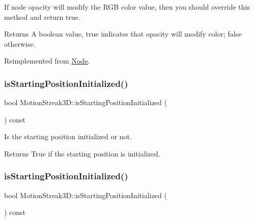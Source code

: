 If node opacity will modify the R\+GB color value, then you should override this method and return true. \begin{DoxyReturn}{Returns}
A boolean value, true indicates that opacity will modify color; false otherwise. 
\end{DoxyReturn}


Reimplemented from \hyperlink{classNode_ae6ce32d2088e2bb3426608334f1091c5}{Node}.

\mbox{\label{classMotionStreak3D_a886e755c13fabbeab8f326b512289ade}} 
\subsubsection{\texorpdfstring{is\+Starting\+Position\+Initialized()}{isStartingPositionInitialized()}\hspace{0.1cm}{\footnotesize\ttfamily [1/2]}}
{\footnotesize\ttfamily bool Motion\+Streak3\+D\+::is\+Starting\+Position\+Initialized (\begin{DoxyParamCaption}{ }\end{DoxyParamCaption}) const\hspace{0.3cm}{\ttfamily [inline]}}

Is the starting position initialized or not.

\begin{DoxyReturn}{Returns}
True if the starting position is initialized. 
\end{DoxyReturn}
\mbox{\label{classMotionStreak3D_a886e755c13fabbeab8f326b512289ade}} 
\subsubsection{\texorpdfstring{is\+Starting\+Position\+Initialized()}{isStartingPositionInitialized()}\hspace{0.1cm}{\footnotesize\ttfamily [2/2]}}
{\footnotesize\ttfamily bool Motion\+Streak3\+D\+::is\+Starting\+Position\+Initialized (\begin{DoxyParamCaption}{ }\end{DoxyParamCaption}) const\hspace{0.3cm}{\ttfamily [inline]}}

